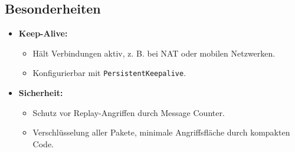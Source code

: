 \subsection{Besonderheiten}
\begin{itemize}
    \item \textbf{Keep-Alive:}
    \begin{itemize}
        \item Hält Verbindungen aktiv, z. B. bei NAT oder mobilen Netzwerken.
        \item Konfigurierbar mit \texttt{PersistentKeepalive}.
    \end{itemize}
    \item \textbf{Sicherheit:}
    \begin{itemize}
        \item Schutz vor Replay-Angriffen durch Message Counter.
        \item Verschlüsselung aller Pakete, minimale Angriffsfläche durch kompakten Code.
    \end{itemize}
\end{itemize}

